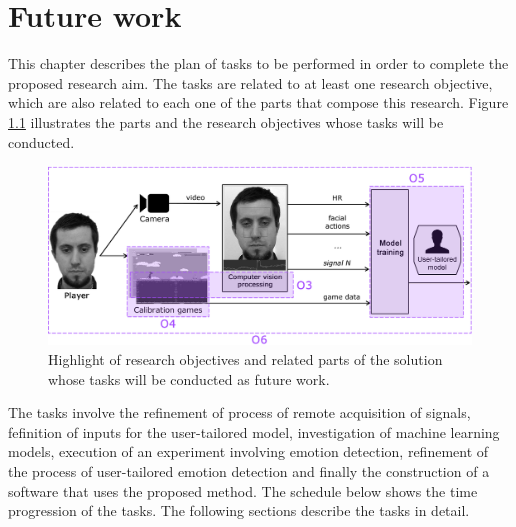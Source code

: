 \chapter{Future work}
\label{ch:closing}

This chapter describes the plan of tasks to be performed in order to complete the proposed research aim. The tasks are related to at least one research objective, which are also related to each one of the parts that compose this research. Figure \ref{fig:future-work-objectives} illustrates the parts and the research objectives whose tasks will be conducted.

\begin{figure}[h]
    \centering
    \includegraphics[width=\textwidth]{figures/future-work-objectives.png}
    \caption{Highlight of research objectives and related parts of the solution whose tasks will be conducted as future work.}
    \label{fig:future-work-objectives}
\end{figure}

The tasks involve the refinement of process of remote acquisition of signals, fefinition of inputs for the user-tailored model, investigation of machine learning models, execution of an experiment involving emotion detection, refinement of the process of user-tailored emotion detection and finally the construction of a software that uses the proposed method. The schedule below shows the time progression of the tasks. The following sections describe the tasks in detail.

